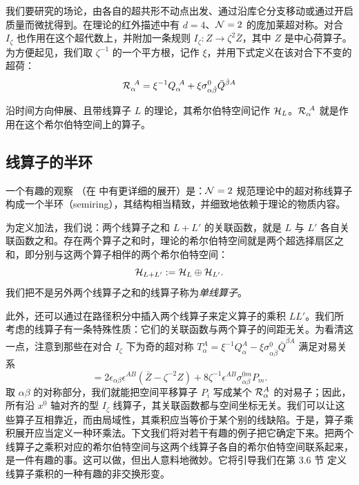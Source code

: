 我们要研究的场论，由各自的超共形不动点出发、通过沿库仑分支移动或通过开启质量而微扰得到。在理论的红外描述中有 $d=4$、$\mathcal{N}=2$ 的庞加莱超对称。对合 $I_\zeta$ 也作用在这个超代数上，并附加一条规则 $I_\zeta: Z\to\zeta^2\bar Z$，其中 $Z$ 是中心荷算子。为方便起见，我们取 $\zeta^{-1}$ 的一个平方根，记作 $\xi$，并用下式定义在该对合下不变的超荷：
\begin{equation}\label{eq:Q-zeta-susy}
\mathcal{R}_{\alpha}^{~A} = \xi^{-1} Q_{\alpha}^{~A} + \xi \sigma^0_{\alpha
\dot \beta } \bar Q^{\dot \beta A}
\end{equation}

沿时间方向伸展、且带线算子 $L$ 的理论，其希尔伯特空间记作 $\mathcal{H}_L$。$\mathcal{R}_\alpha^{~A}$ 就是作用在这个希尔伯特空间上的算子。

\subsection{线算子的半环}\label{subsubsec:RingStructure}

一个有趣的观察 \cite{Kapustin:2006hi}（在 \cite{Kapustin:2007wm} 中有更详细的展开）是：$\mathcal{N}=2$ 规范理论中的超对称线算子构成一个半环（semiring），其结构相当精致，并细致地依赖于理论的物质内容。

为定义加法，我们说：两个线算子之和 $L+L'$ 的关联函数，就是 $L$ 与 $L'$ 各自关联函数之和。存在两个算子之和时，理论的希尔伯特空间就是两个超选择扇区之和，即分别与这两个算子相伴的两个希尔伯特空间：
\begin{equation}\label{eq:sum-line}
\mathcal{H}_{L+L'}:= \mathcal{H}_L \oplus \mathcal{H}_{L'}.
\end{equation}
我们把不是另外两个线算子之和的线算子称为\emph{单线算子}。

此外，还可以通过在路径积分中插入两个线算子来定义算子的乘积 $LL'$。我们所考虑的线算子有一条特殊性质：它们的关联函数与两个算子的间距无关。为看清这一点，注意到那些在对合 $I_\zeta$ 下为奇的超对称 $T_{\alpha}^A = \xi^{-1} Q_\alpha^A -  \xi \sigma^0_{\alpha \dot \beta } \bar Q^{\dot \beta A}$ 满足对易关系
\begin{equation}
[\CR_\alpha^A, T_\beta^B ] = 2 \epsilon_{\alpha\beta} \epsilon^{AB}
(\bar   Z - \zeta^{-2} Z) + 8 \zeta^{-1} \epsilon^{AB}
\sigma^{0m}_{\alpha\beta} P_m.
\end{equation}
取 $\alpha\beta$ 的对称部分，我们就能把空间平移算子 $P_i$ 写成某个 $\mathcal{R}_\alpha^A$ 的对易子；因此，所有沿 $x^0$ 轴对齐的型 $I_\zeta$ 线算子，其关联函数都与空间坐标无关。我们可以让这些算子互相靠近，而由局域性，其乘积应当等价于某个别的线缺陷。于是，算子乘积展开应当定义一种环乘法。下文我们将对若干有趣的例子把它确定下来。把两个线算子之乘积对应的希尔伯特空间与这两个线算子各自的希尔伯特空间联系起来，是一件有趣的事。这可以做，但出人意料地微妙。它将引导我们在第 3.6 节%
定义线算子乘积的一种有趣的非交换形变。

